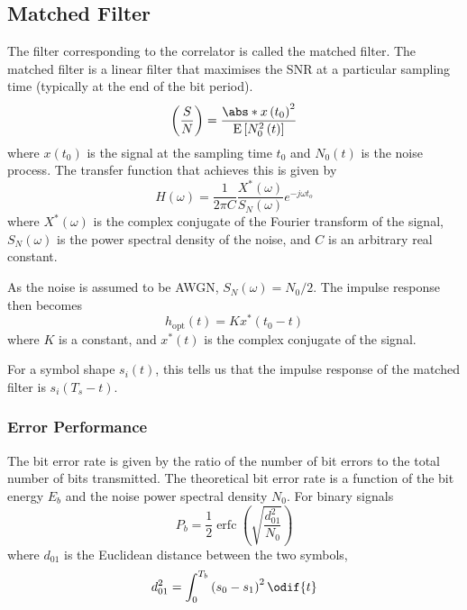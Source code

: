 \documentclass{article}
\DeclareMathOperator{\erfc}{erfc}
\begin{document}
\subsection{Matched Filter}
The filter corresponding to the correlator is called the matched
filter. The matched filter is a linear filter that maximises the SNR at
a particular sampling time (typically at the end of the bit period).
\begin{equation*}
    \left( \frac{S}{N} \right) = \frac{\abs*{x\left( t_0 \right)}^2}{\mathrm{E}\left[ N_0^2\left( t \right) \right]}
\end{equation*}
where \(x\left( t_0 \right)\) is the signal at the sampling time \(t_0\)
and \(N_0\left( t \right)\) is the noise process. The transfer function
that achieves this is given by
\begin{equation*}
    H\left( \omega \right) = \frac{1}{2 \pi C} \frac{X^\ast\left( \omega \right)}{S_N\left( \omega \right)} e^{-j\omega t_o}
\end{equation*}
where \(X^\ast\left( \omega \right)\) is the complex conjugate of the
Fourier transform of the signal, \(S_N\left( \omega \right)\) is the
power spectral density of the noise, and \(C\) is an arbitrary real
constant.

As the noise is assumed to be AWGN, \(S_N\left( \omega \right) =
N_0/2\). The impulse response then becomes
\begin{equation*}
    h_{\mathrm{opt}}\left( t \right) = K x^\ast\left( t_0 - t \right)
\end{equation*}
where \(K\) is a constant, and \(x^\ast\left( t \right)\) is the
complex conjugate of the signal.

For a symbol shape \(s_i\left( t \right)\), this tells us that the
impulse response of the matched filter is \(s_i\left( T_s - t
\right)\).
\subsubsection{Error Performance}
The bit error rate is given by the ratio of the number of bit errors to
the total number of bits transmitted. The theoretical bit error rate is
a function of the bit energy \(E_b\) and the noise power spectral
density \(N_0\). For binary signals
\begin{equation*}
    P_b = \frac{1}{2} \erfc{\left( \sqrt{\frac{d_{\mathrm{01}}^2}{N_0}} \right)}
\end{equation*}
where \(d_{\mathrm{01}}\) is the Euclidean distance between the two
symbols,
\begin{equation*}
    d_{\mathrm{01}}^2 = \int_0^{T_b} \left( s_0 - s_1 \right)^2 \odif{t}
\end{equation*}
\end{document}
